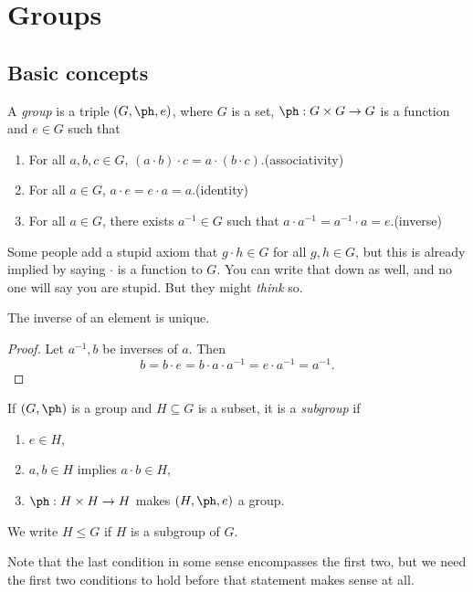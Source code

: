 \documentclass[a4paper]{article}
\begin{document}
\tableofcontents

\section{Groups}
\subsection{Basic concepts}
\begin{defi}[Group]
  A \emph{group} is a triple $(G, \ph, e)$, where $G$ is a set, $\ph: G\times G \to G$ is a function and $e \in G$ such that
  \begin{enumerate}
    \item For all $a, b, c \in G$, $(a \cdot b) \cdot c = a \cdot (b \cdot c)$.\hfill (associativity)
    \item For all $a \in G$, $a \cdot e = e \cdot a = a$.\hfill (identity)
    \item For all $a \in G$, there exists $a^{-1} \in G$ such that $a \cdot a^{-1} = a^{-1} \cdot a = e$.\hfill (inverse)
  \end{enumerate}
\end{defi}
Some people add a stupid axiom that $g \cdot h \in G$ for all $g, h \in G$, but this is already implied by saying $\cdot$ is a function to $G$. You can write that down as well, and no one will say you are stupid. But they might \emph{think} so.

\begin{lemma}
  The inverse of an element is unique.
\end{lemma}

\begin{proof}
  Let $a^{-1}, b$ be inverses of $a$. Then
  \[
    b = b \cdot e = b \cdot a \cdot a^{-1} = e \cdot a^{-1} = a^{-1}.
  \]
\end{proof}

\begin{defi}[Subgroup]
  If $(G, \ph)$ is a group and $H \subseteq G$ is a subset, it is a \emph{subgroup} if
  \begin{enumerate}
    \item $e \in H$,
    \item $a, b \in H$ implies $a\cdot b\in H$,
    \item $\ph: H \times H \to H$ makes $(H, \ph, e)$ a group.
  \end{enumerate}
  We write $H \leq G$ if $H$ is a subgroup of $G$.
\end{defi}
Note that the last condition in some sense encompasses the first two, but we need the first two conditions to hold before that statement makes sense at all.
\end{document}

